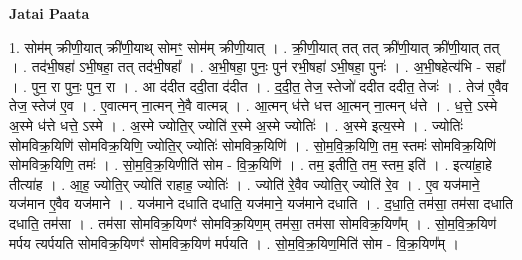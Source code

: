 \documentclass[17pt]{extarticle}
\begin{document}
\textbf{Jatai Paata} \newline

1. सोम॑म् क्रीणी॒यात् क्री॑णी॒याथ् सोमꣳ॒॒ सोम॑म् क्रीणी॒यात् । . क्री॒णी॒यात् तत् तत् क्री॑णी॒यात् क्री॑णी॒यात् तत् । . तद॑भी॒षहा॑ ऽभी॒षहा॒ तत् तद॑भी॒षहा᳚ । . अ॒भी॒षहा॒ पुनः॒ पुन॑ रभी॒षहा॑ ऽभी॒षहा॒ पुनः॑ । . अ॒भी॒षहेत्य॑भि - सहा᳚ । . पुन॒ रा पुनः॒ पुन॒ रा । . आ द॑दीत ददी॒ता द॑दीत । . द॒दी॒त॒ तेज॒ स्तेजो॑ ददीत ददीत॒ तेजः॑ । . तेज॑ ए॒वैव तेज॒ स्तेज॑ ए॒व । . ए॒वात्मन् ना॒त्मन् ने॒वै वात्मन्न् । . आ॒त्मन् ध॑त्ते धत्त आ॒त्मन् ना॒त्मन् ध॑त्ते । . ध॒त्ते॒ ऽस्मे अ॒स्मे ध॑त्ते धत्ते॒ ऽस्मे । . अ॒स्मे ज्योति॒र् ज्योति॑ र॒स्मे अ॒स्मे ज्योतिः॑ । . अ॒स्मे इत्य॒स्मे । . ज्योतिः॑ सोमविक्र॒यिणि॑ सोमविक्र॒यिणि॒ ज्योति॒र् ज्योतिः॑ सोमविक्र॒यिणि॑ । . सो॒म॒वि॒क्र॒यिणि॒ तम॒ स्तमः॑ सोमविक्र॒यिणि॑ सोमविक्र॒यिणि॒ तमः॑ । . सो॒म॒वि॒क्र॒यिणीति॑ सोम - वि॒क्र॒यिणि॑ । . तम॒ इतीति॒ तम॒ स्तम॒ इति॑ । . इत्या॑हा॒हे तीत्या॑ह । . आ॒ह॒ ज्योति॒र् ज्योति॑ राहाह॒ ज्योतिः॑ । . ज्योति॑ रे॒वैव ज्योति॒र् ज्योति॑ रे॒व । . ए॒व यज॑माने॒ यज॑मान ए॒वैव यज॑माने । . यज॑माने दधाति दधाति॒ यज॑माने॒ यज॑माने दधाति । . द॒धा॒ति॒ तम॑सा॒ तम॑सा दधाति दधाति॒ तम॑सा । . तम॑सा सोमविक्र॒यिणꣳ॑ सोमविक्र॒यिण॒म् तम॑सा॒ तम॑सा सोमविक्र॒यिण᳚म् । . सो॒म॒वि॒क्र॒यिण॑ मर्पय त्यर्पयति सोमविक्र॒यिणꣳ॑ सोमविक्र॒यिण॑ मर्पयति । . सो॒म॒वि॒क्र॒यिण॒मिति॑ सोम - वि॒क्र॒यिण᳚म् । \newline
\end{document}
